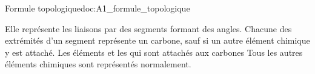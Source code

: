 \begin{doc}{Formule topologique}{doc:A1_formule_topologique}
  \begin{importants}  
    Elle représente les liaisons  par des segments formant des angles.
    Chacune des extrémités d'un segment représente un carbone, sauf si un autre élément chimique y est attaché.
    Les éléments  et les  qui sont attachés aux carbones 
    Tous les autres éléments chimiques sont représentés normalement.
  \end{importants}

  \exemple*
  \vspace*{-10pt}
  
  \begin{center}
    \qq{}
    \qq{}
  \end{center}
  \begin{center}
    \qq{}
    \qq{}
  \end{center}
\end{doc}

